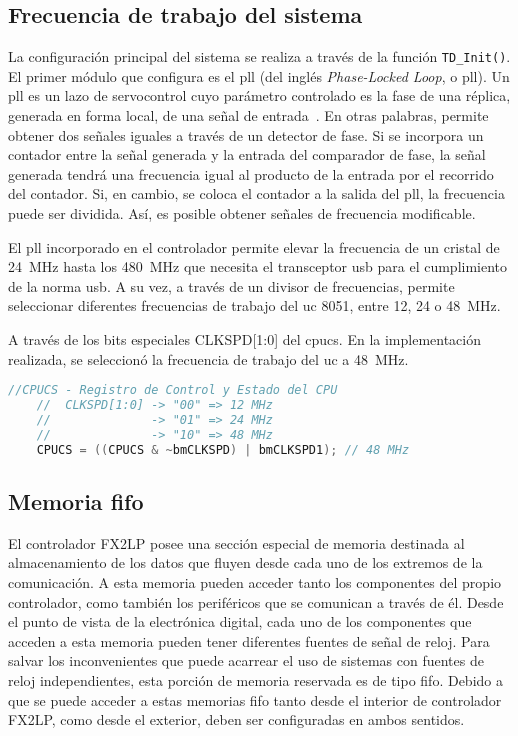 \subsection{Frecuencia de trabajo del sistema}
	La configuración principal del sistema se realiza a través de la función \verb|TD_Init()|. El primer módulo que configura es el \acrshort{pll} (del inglés {\it Phase-Locked Loop}, o \acrlong{pll}). Un \acrshort{pll} es un lazo de servocontrol cuyo parámetro controlado es la fase de una réplica, generada en forma local, de una señal de entrada~\cite{Sklar2001}. En otras palabras, permite obtener dos señales iguales a través de un detector de fase. Si se incorpora un contador entre la señal generada y la entrada del comparador de fase, la señal generada tendrá una frecuencia igual al producto de la entrada por el recorrido del contador. Si, en cambio, se coloca el contador a la salida del \acrshort{pll}, la frecuencia puede ser dividida. Así, es posible obtener señales de frecuencia modificable.

	El \acrshort{pll} incorporado en el controlador permite elevar la frecuencia de un cristal de \SI{24}{\mega\hertz} hasta los \SI{480}{\mega\hertz} que necesita el transceptor \acrshort{usb} para el cumplimiento de la norma \acrshort{usb}. A su vez, a través de un divisor de frecuencias, permite seleccionar diferentes frecuencias de trabajo del \acrshort{uc} 8051, entre \si{12}, \si{24} o \SI{48}{\mega\hertz}.
	
	A través de los bits especiales CLKSPD[1:0] del \acrfull{cpucs}. En la implementación realizada, se seleccionó la frecuencia de trabajo del \acrshort{uc} a \SI{48}{\mega\hertz}.
	
	\begin{lstlisting}[language=C,backgroundcolor=\color{gray!30}]
	//CPUCS - Registro de Control y Estado del CPU
	//	CLKSPD[1:0] -> "00" => 12 MHz
	//				-> "01" => 24 MHz
	//				-> "10" => 48 MHz
	CPUCS = ((CPUCS & ~bmCLKSPD) | bmCLKSPD1); // 48 MHz
	\end{lstlisting}	

\subsection{Memoria \acrshort{fifo}}
	El controlador FX2LP posee una sección especial de memoria destinada al almacenamiento de los datos que fluyen desde cada uno de los extremos de la comunicación. A esta memoria pueden acceder tanto los componentes del propio controlador, como también los periféricos que se comunican a través de él. Desde el punto de vista de la electrónica digital, cada uno de los componentes que acceden a esta memoria pueden tener diferentes fuentes de señal de reloj. Para salvar los inconvenientes que puede acarrear el uso de sistemas con fuentes de reloj independientes, esta porción de memoria reservada es de tipo \acrshort{fifo}. Debido a que se puede acceder a estas memorias \acrshort{fifo} tanto desde el interior de controlador FX2LP, como desde el exterior, deben ser configuradas en ambos sentidos.
	
